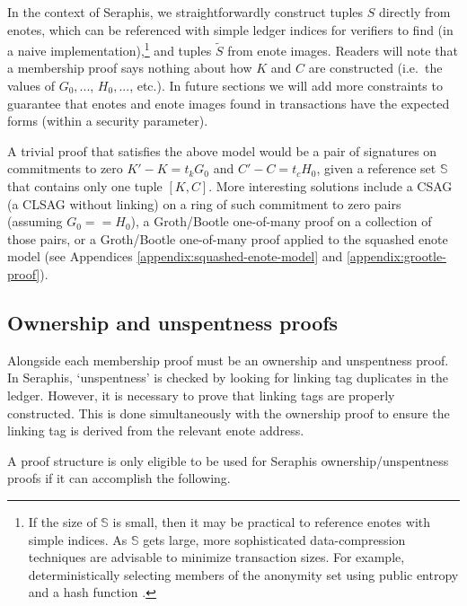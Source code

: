 In the context of Seraphis, we straightforwardly construct tuples $S$ directly from enotes, which can be referenced with simple ledger indices for verifiers to find (in a naive implementation),\footnote{If the size of $\mathbb{S}$ is small, then it may be practical to reference enotes with simple indices. As $\mathbb{S}$ gets large, more sophisticated data-compression techniques are advisable to minimize transaction sizes. For example, deterministically selecting members of the anonymity set using public entropy and a hash function \cite{chator-green-how-to-squeeze-crowd}.} and tuples $\tilde{S}$ from enote images. Readers will note that a membership proof says nothing about how $K$ and $C$ are constructed (i.e.\ the values of $G_0,...$, $H_0,...$, etc.). In future sections we will add more constraints to guarantee that enotes and enote images found in transactions have the expected forms (within a security parameter).

A trivial proof that satisfies the above model would be a pair of signatures on commitments to zero $K' - K = t_k G_0$ and $C' - C = t_c H_0$, given a reference set $\mathbb{S}$ that contains only one tuple $[K, C]$. More interesting solutions include a CSAG (a CLSAG \cite{clsag-eprint} without linking) on a ring of such commitment to zero pairs (assuming $G_0 == H_0$), a Groth/Bootle one-of-many proof \cite{groth-one-out-of-many, bootle-one-of-many, triptych-preprint, lelantus-spark} on a collection of those pairs, or a Groth/Bootle one-of-many proof applied to the squashed enote model (see Appendices \ref{appendix:squashed-enote-model} and \ref{appendix:grootle-proof}).


\subsection{Ownership and unspentness proofs}
\label{subsec:seraphis-ownership-unspentness-proofs}

Alongside each membership proof must be an ownership and unspentness proof. In Seraphis, `unspentness' is checked by looking for linking tag duplicates in the ledger. However, it is necessary to prove that linking tags are properly constructed. This is done simultaneously with the ownership proof to ensure the linking tag is derived from the relevant enote address.

A proof structure is only eligible to be used for Seraphis ownership/unspentness proofs if it can accomplish the following.

